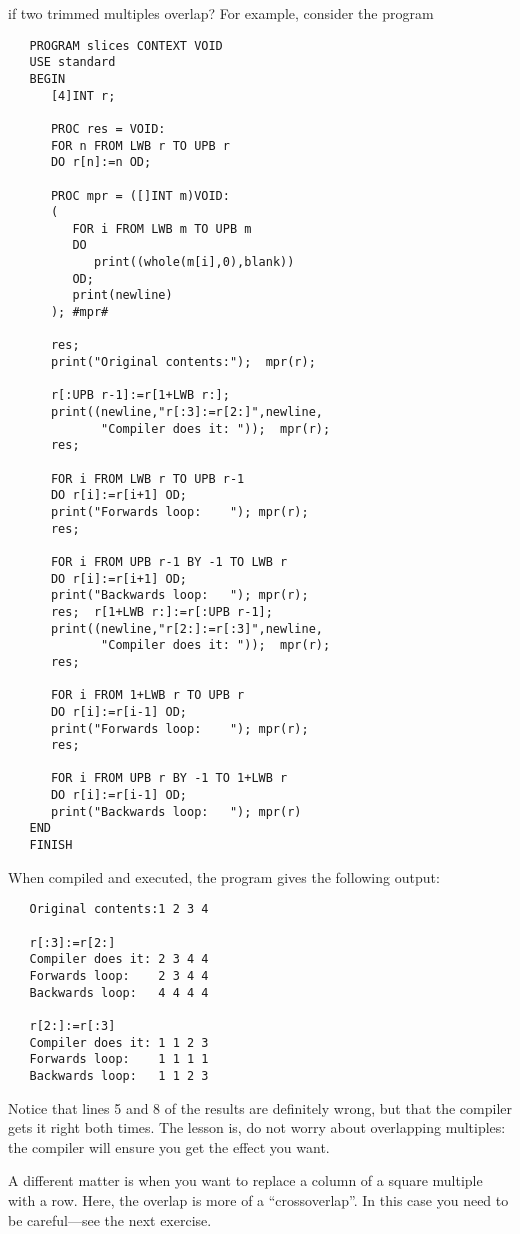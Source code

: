  if two
trimmed multiples overlap? For example, consider the program
\begin{verbatim}
   PROGRAM slices CONTEXT VOID
   USE standard
   BEGIN
      [4]INT r;

      PROC res = VOID:
      FOR n FROM LWB r TO UPB r
      DO r[n]:=n OD;

      PROC mpr = ([]INT m)VOID:
      (
         FOR i FROM LWB m TO UPB m
         DO
            print((whole(m[i],0),blank))
         OD;
         print(newline)
      ); #mpr#

      res;
      print("Original contents:");  mpr(r);

      r[:UPB r-1]:=r[1+LWB r:];
      print((newline,"r[:3]:=r[2:]",newline,
             "Compiler does it: "));  mpr(r);
      res;

      FOR i FROM LWB r TO UPB r-1
      DO r[i]:=r[i+1] OD;
      print("Forwards loop:    "); mpr(r);
      res;

      FOR i FROM UPB r-1 BY -1 TO LWB r
      DO r[i]:=r[i+1] OD;
      print("Backwards loop:   "); mpr(r);
      res;  r[1+LWB r:]:=r[:UPB r-1];
      print((newline,"r[2:]:=r[:3]",newline,
             "Compiler does it: "));  mpr(r);
      res;

      FOR i FROM 1+LWB r TO UPB r
      DO r[i]:=r[i-1] OD;
      print("Forwards loop:    "); mpr(r);
      res;

      FOR i FROM UPB r BY -1 TO 1+LWB r
      DO r[i]:=r[i-1] OD;
      print("Backwards loop:   "); mpr(r)
   END
   FINISH
\end{verbatim}
\noindent
When compiled and executed, the program gives the following output:
\begin{verbatim}
   Original contents:1 2 3 4 
   
   r[:3]:=r[2:]
   Compiler does it: 2 3 4 4 
   Forwards loop:    2 3 4 4 
   Backwards loop:   4 4 4 4 
   
   r[2:]:=r[:3]
   Compiler does it: 1 1 2 3 
   Forwards loop:    1 1 1 1 
   Backwards loop:   1 1 2 3 
\end{verbatim}
\noindent
Notice that lines 5 and 8 of the results are definitely wrong, but that
the compiler gets it right both times. The lesson is, do not worry
about overlapping multiples:  the compiler will ensure you get the
effect you want.

A different matter is when you want to replace a column of a square
multiple with a row. Here, the overlap is more of a ``crossoverlap''.
In this case you need to be careful---see the next exercise.

